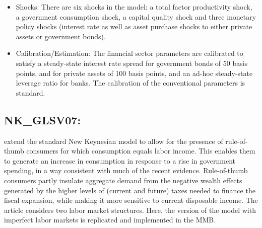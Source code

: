 \documentclass[11pt,a4paper]{article}
\begin{document}
\begin{itemize}
		\item Shocks: There are six shocks in the model: a total factor productivity shock, a government consumption shock, a capital quality shock and three monetary policy shocks (interest rate as well as asset purchase shocks to either private assets or government bonds). 
		\item Calibration/Estimation: The financial sector parameters are calibrated to satisfy a steady-state interest rate spread for government bonds of 50 basis points, and for private assets of 100 basis points, and an ad-hoc steady-state leverage ratio for banks. The calibration of the conventional parameters is standard.
	\end{itemize}
	
	
	
	\subsection{NK\_GLSV07: \texorpdfstring{\cite{gali2007understanding}}{GalÃƒÂ­ et al. (2007)}}
	\label{NKGLSV07}
	\cite{gali2007understanding} extend the standard New Keynesian model to allow for the presence of rule-of-thumb
	consumers for which consumption equals labor income. This enables them to generate an increase in consumption in response to a rise in government spending, in a way consistent with much of the recent evidence. Rule-of-thumb consumers partly insulate aggregate demand from the negative wealth effects generated by the higher levels of (current and future) taxes needed to finance the fiscal expansion, while making it more sensitive to current disposable income. The article considers two labor market structures. Here, the version of the model with imperfect labor markets is replicated and implemented in the MMB.
	
\end{document}
